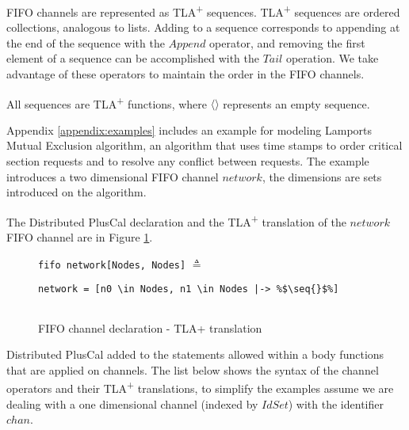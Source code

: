 \documentclass{thesul}
\newcommand{\tlaplus}{TLA\textsuperscript{+}\xspace}
\newcommand{\seq}[1]{\langle #1 \rangle}
\begin{document}
FIFO channels are represented as \tlaplus sequences.
\tlaplus sequences are ordered collections, analogous to lists. Adding to a sequence corresponds to appending at the end of the sequence with the $Append$ operator, and removing the first element of a sequence can be accomplished with the $Tail$ operation. We take advantage of these operators to maintain the order in the FIFO channels.

All sequences are \tlaplus functions, where $\seq{}$ represents an empty sequence.

Appendix \ref{appendix:examples} includes an example for  modeling Lamports Mutual Exclusion algorithm, an algorithm that uses time stamps to order critical section requests and to resolve any conflict between requests. The example introduces a two dimensional FIFO channel $network$, the dimensions are sets introduced on the algorithm.

The Distributed PlusCal declaration and the \tlaplus translation of the $network$ FIFO channel are in Figure \ref{fifochannels}.
 

\FloatBarrier
\begin{figure}[!h]
\begin{minipage}{.3\textwidth}

\lstinline|fifo network[Nodes, Nodes]| $\triangleq$ 
\end{minipage}\hfill
\begin{minipage}{.7\textwidth}
\begin{lstlisting}[escapechar=\%, frame = none, numbers = none]
network = [n0 \in Nodes, n1 \in Nodes |-> %$\seq{}$%]
  
\end{lstlisting}  
\end{minipage}\hfill
\caption{FIFO channel declaration - TLA+ translation}
\label{fifochannels}
\end{figure}
\FloatBarrier


Distributed PlusCal added to the statements allowed within a body functions that are applied on channels.
The list below shows the syntax of the channel operators and their \tlaplus translations, to simplify the examples assume we are dealing with a one dimensional channel (indexed by $IdSet$) with the identifier $chan$.
\end{document}
